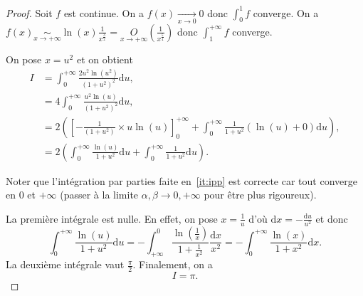 \begin{proof}
    Soit \function{f}{]0,+\infty}{\R}{x}{\frac{\sqrt{x}\ln(x)}{(1+x)^{2}}}
    $f$ est continue. On a $f(x)\xrightarrow[x\to0]{}0$ donc $\int_{0}^{1}f$ converge. On a $f(x)\underset{x\to+\infty}{\sim}\ln(x)\frac{1}{x^{\frac{3}{2}}}=\underset{x\to+\infty}{O}\left(\frac{1}{x^{\frac{5}{4}}}\right)$ donc $\int_{1}^{+\infty}f$ converge.

    On pose $x=u^{2}$ et on obtient 
    \begin{align}
        I
        &=\int_{0}^{+\infty}\frac{2u^{2}\ln(u^{2})}{(1+u^{2})^{2}}\mathrm{d}u,\\
        &=4\int_{0}^{+\infty}\frac{u^{2}\ln(u)}{(1+u^{2})^{2}}\mathrm{d}u,\\
        &=2\left(\left[-\frac{1}{(1+u^{2})}\times u\ln(u)\right]_{0}^{+\infty}+\int_{0}^{+\infty}\frac{1}{1+u^{2}}\left(\ln(u)+0\right)\mathrm{d}u\right),\label{it:ipp}\\
        &=2\left(\int_{0}^{+\infty}\frac{\ln(u)}{1+u^{2}}\mathrm{d}u+\int_{0}^{+\infty}\frac{1}{1+u^{2}}\mathrm{d}u\right).
    \end{align}

    Noter que l'intégration par parties faite en~\ref{it:ipp} est correcte car tout converge en 0 et $+\infty$ (passer à la limite $\alpha,\beta\to0,+\infty$ pour être plus rigoureux).

    La première intégrale est nulle. En effet, on pose $x=\frac{1}{u}$ d'où $\mathrm{d}x=-\frac{\mathrm{d}u}{u^{2}}$ et donc 
    \begin{equation}
        \int_{0}^{+\infty}\frac{\ln(u)}{1+u^{2}}\mathrm{d}u=-\int_{+\infty}^{0}\frac{\ln\left(\frac{1}{x}\right)}{1+\frac{1}{x^{2}}}\frac{\mathrm{d}x}{x^{2}}=-\int_{0}^{+\infty}\frac{\ln(x)}{1+x^{2}}\mathrm{d}x.
    \end{equation}
    La deuxième intégrale vaut $\frac{\pi}{2}$. Finalement, on a 
    \begin{equation}
        \boxed{
            I=\pi.
        }
    \end{equation}
\end{proof}


